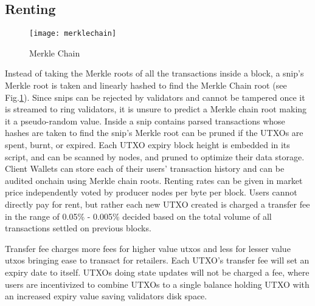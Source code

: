 \documentclass[../Bitcoin Blink.tex]{subfiles}
\begin{document}
\subsection{Renting}
\begin{figure}[h]
\begin{center}
\texttt{[image: merklechain]}
\caption{Merkle Chain}
\label{chain}
\end{center}
\end{figure}
Instead of taking the Merkle roots of all the transactions inside a block, a snip's Merkle root is taken and linearly hashed to find the Merkle Chain root (see Fig.\ref{chain}). Since snips can be rejected by validators and cannot be tampered once it is streamed to ring validators, it is unsure to predict a Merkle chain root making it a pseudo-random value. Inside a snip contains parsed transactions whose hashes are taken to find the snip's Merkle root can be pruned if the UTXOs are spent, burnt, or expired. Each UTXO expiry block height is embedded in its script, and can be scanned by nodes, and pruned to optimize their data storage. Client Wallets can store each of their users' transaction history and can be audited onchain using Merkle chain roots. Renting rates can be given in market price independently voted by producer nodes per byte per block. Users cannot directly pay for rent, but rather each new UTXO created is charged a transfer fee in the range of 0.05\% - 0.005\% decided based on the total volume of all transactions settled on previous blocks.

 Transfer fee charges more fees for higher value utxos and less for lesser value utxos bringing ease to transact for retailers. Each UTXO's transfer fee will set an expiry date to itself. UTXOs doing state updates \cite{stateupdate} will not be charged a fee, where users are incentivized to combine UTXOs to a single balance holding UTXO with an increased expiry value saving validators disk space.  
\end{document}
